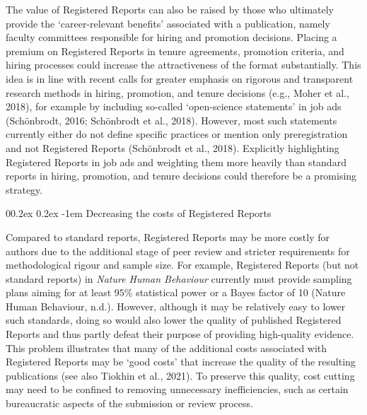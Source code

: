 \documentclass[
  ,man,mask,floatsintext]{apa6}
\makeatletter
\let\oldparagraph\paragraph
\renewcommand{\paragraph}[1]{\oldparagraph{#1}\mbox{}}
\renewcommand{\paragraph}{\@startsection{paragraph}{4}{\parindent}%
  {0\baselineskip \@plus 0.2ex \@minus 0.2ex}%
  {-1em}%
  {\normalfont\normalsize\bfseries\itshape\typesectitle}}
\makeatother
\begin{document}
The value of Registered Reports can also be raised by those who ultimately provide the `career-relevant benefits' associated with a publication, namely faculty committees responsible for hiring and promotion decisions.
Placing a premium on Registered Reports in tenure agreements, promotion criteria, and hiring processes could increase the attractiveness of the format substantially.
This idea is in line with recent calls for greater emphasis on rigorous and transparent research methods in hiring, promotion, and tenure decisions (e.g., Moher et al., 2018), for example by including so-called `open-science statements' in job ads (Schönbrodt, 2016; Schönbrodt et al., 2018).
However, most such statements currently either do not define specific practices or mention only preregistration and not Registered Reports (Schönbrodt et al., 2018).
Explicitly highlighting Registered Reports in job ads and weighting them more heavily than standard reports in hiring, promotion, and tenure decisions could therefore be a promising strategy.

\par\vspace{0.4\baselineskip}

\hypertarget{decreasing-the-costs-of-registered-reports}{%
\paragraph{Decreasing the costs of Registered Reports}\label{decreasing-the-costs-of-registered-reports}}

Compared to standard reports, Registered Reports may be more costly for authors due to the additional stage of peer review
and stricter requirements for methodological rigour and sample size.
For example, Registered Reports (but not standard reports) in \emph{Nature Human Behaviour} currently must provide sampling plans aiming for at least \(95\%\) statistical power or a Bayes factor of 10 (Nature Human Behaviour, n.d.).
However, although it may be relatively easy to lower such standards,
doing so would also lower the quality of published Registered Reports and thus partly defeat their purpose of providing high-quality evidence.
This problem illustrates that many of the additional costs associated with Registered Reports may be `good costs' that increase the quality of the resulting publications (see also Tiokhin et al., 2021).
To preserve this quality, cost cutting may need to be confined to removing unnecessary inefficiencies, such as certain bureaucratic aspects of the submission or review process.
\end{document}
